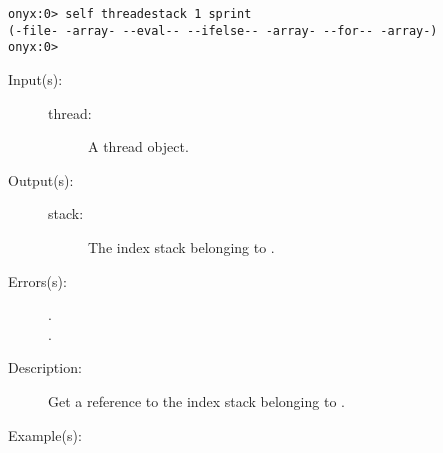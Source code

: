 \begin{description}
\begin{description}
\begin{verbatim}
onyx:0> self threadestack 1 sprint
(-file- -array- --eval-- --ifelse-- -array- --for-- -array-)
onyx:0>
		\end{verbatim}
	\end{description}
\label{systemdict:threadistack}
\item[{\onyxop{thread}{threadistack}{stack}}: ]
	\begin{description}\item[]
	\item[Input(s): ]
		\begin{description}\item[]
		\item[thread: ]
			A thread object.
		\end{description}
	\item[Output(s): ]
		\begin{description}\item[]
		\item[stack: ]
			The index stack belonging to .
		\end{description}
	\item[Errors(s): ]
		\begin{description}\item[]
		\item[.]
		\item[.]
		\end{description}
	\item[Description: ]
		Get a reference to the index stack belonging to .
	\item[Example(s): ]\begin{verbatim}


\end{verbatim}
\end{description}
\end{description}
